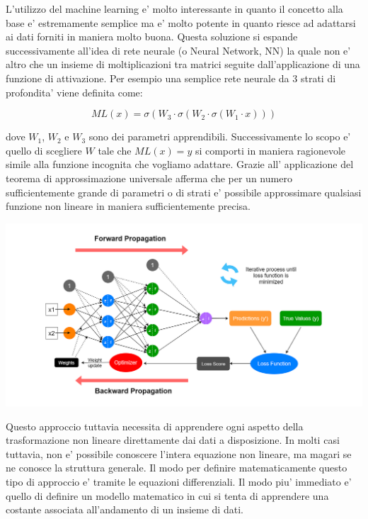 L'utilizzo del machine learning e' molto interessante in quanto il concetto 
alla base e' estremamente semplice ma e' molto potente in quanto riesce ad 
adattarsi ai dati forniti in maniera molto buona. Questa soluzione si espande 
successivamente all'idea di rete neurale (o Neural Network, NN) la quale 
non e' altro che un insieme di moltiplicazioni tra matrici seguite
dall'applicazione di una funzione di attivazione. Per esempio una semplice 
rete neurale da 3 strati di profondita' viene definita come:

$$ML(x) = \sigma(W_3 \cdot \sigma(W_2 \cdot \sigma(W_1 \cdot x)))$$

dove $W_1$, $W_2$ e $W_3$ sono dei parametri apprendibili. Successivamente 
lo scopo e' quello di scegliere $W$ tale che $ML(x) = y$ si comporti in maniera
ragionevole simile alla funzione incognita che vogliamo adattare. Grazie all'
applicazione del teorema di approssimazione universale \cite{wiki:Universal_approximation_theorem}
afferma che per un numero sufficientemente grande di parametri o di strati 
e' possibile approssimare qualsiasi funzione non lineare in maniera 
sufficientemente precisa. 

\begin{minipage}{\linewidth}
    \centering
    \includegraphics[width=\textwidth]{img/1_ZXAOUqmlyECgfVa81Sr6Ew.png}
    \label{fig:NN_example}
\end{minipage}

Questo approccio tuttavia necessita di apprendere ogni aspetto della 
trasformazione non lineare direttamente dai dati a disposizione. In molti 
casi tuttavia, non e' possibile conoscere l'intera equazione non lineare, 
ma magari se ne conosce la struttura generale. Il modo per definire 
matematicamente questo tipo di approccio e' tramite le equazioni differenziali.
Il modo piu' immediato e' quello di definire un modello matematico in 
cui si tenta di apprendere una costante associata all'andamento di un 
insieme di dati. 

